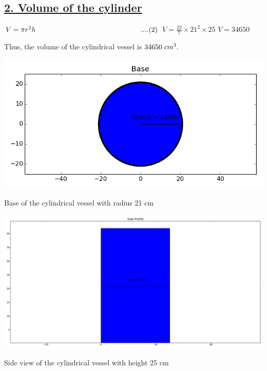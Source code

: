\documentclass[journal,12pt,twocolumn]{IEEEtran}
\begin{document}
\subsection*{\underline{\textbf{2. Volume of the cylinder}}}
\newline
$V = \pi{r^2h}\hspace{5.25cm}....(2)$
\newline
$V = \frac{22}{7}\times21^2\times25$
\newline
$V = 34650$
\vspace{1mm}
\begin{center}
    {Thus, the volume of the cylindrical vessel is $34650 \hspace{1mm} cm^3.$}
\end{center}
\includegraphics[width = \columnwidth]{Figures/Base.png}
\begin{center}
Base of the cylindrical vessel with radius 21 cm
\end{center}
\includegraphics[width = \columnwidth]{Figures/Side Profile.png}
\begin{center}
Side view of the cylindrical vessel with height 25 cm
\end{center}
\end{document}

